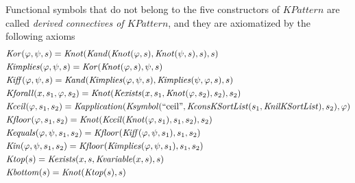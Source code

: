 \documentclass[UTF8,11pt]{article}
\theoremstyle{plain}
\theoremstyle{definition}
\theoremstyle{remark}
\newcommand{\Ksymbol}{\mathit{Ksymbol}}
\newcommand{\KnilKSortList}{\mathit{KnilKSortList}}
\newcommand{\KconsKSortList}{\mathit{KconsKSortList}}
\newcommand{\KPattern}{\mathit{KPattern}}
\newcommand{\Kvariable}{\mathit{Kvariable}}
\newcommand{\Kand}{\mathit{Kand}}
\newcommand{\Kor}{\mathit{Kor}}
\newcommand{\Kimplies}{\mathit{Kimplies}}
\newcommand{\Kiff}{\mathit{Kiff}}
\newcommand{\Knot}{\mathit{Knot}}
\newcommand{\Kapplication}{\mathit{Kapplication}}
\newcommand{\Kexists}{\mathit{Kexists}}
\newcommand{\Kforall}{\mathit{Kforall}}
\newcommand{\Kequals}{\mathit{Kequals}}
\newcommand{\Kin}{\mathit{Kin}}
\newcommand{\Ktop}{\mathit{Ktop}}
\newcommand{\Kbottom}{\mathit{Kbottom}}
\newcommand{\Kfloor}{\mathit{Kfloor}}
\newcommand{\Kceil}{\mathit{Kceil}}
\newcommand{\quot}[1]{\mathrm{``#1"}}
\begin{document}
Functional symbols that do not belong to the five constructors of $\KPattern$ are called \emph{derived connectives of $\KPattern$}, and they are axiomatized by the following axioms
\begin{align*}
  & \Kor(\varphi, \psi, s) = \Knot(\Kand(\Knot(\varphi, s), \Knot(\psi, s), s), s)
  \\
  & \Kimplies(\varphi, \psi, s) = \Kor(\Knot(\varphi, s), \psi, s)
  \\
  & \Kiff(\varphi, \psi, s) = \Kand(\Kimplies(\varphi, \psi, s), \Kimplies(\psi, \varphi, s), s)
  \\
  & \Kforall(x, s_1, \varphi, s_2) = \Knot(\Kexists(x, s_1, \Knot(\varphi, s_2), s_2), s_2)
  \\
  & \Kceil(\varphi, s_1, s_2) =
    \Kapplication(\Ksymbol(\quot{ceil}, \KconsKSortList(s_1, \KnilKSortList), s_2), \varphi)
  \\
  & \Kfloor(\varphi, s_1, s_2) = \Knot(\Kceil(\Knot(\varphi, s_1), s_1, s_2), s_2)
  \\
  & \Kequals(\varphi, \psi, s_1, s_2) = \Kfloor(\Kiff(\varphi, \psi, s_1), s_1, s_2)
  \\
  & \Kin(\varphi, \psi, s_1, s_2) = \Kfloor(\Kimplies(\varphi, \psi, s_1), s_1, s_2)
  \\
  & \Ktop(s) = \Kexists(x, s, \Kvariable(x, s), s)
  \\
  & \Kbottom(s) = \Knot(\Ktop(s), s)
\end{align*}
\end{document}
